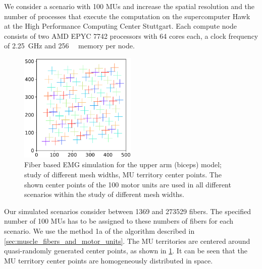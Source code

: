 We consider a scenario with 100 MUs and increase the spatial resolution and the number of processes that execute the computation on the supercomputer Hawk at the High Performance Computing Center Stuttgart. Each compute node consists of two AMD EPYC 7742 processors with 64 cores each, a clock frequency of \SI{2.25}{\giga\hertz} and \SI{256}{\giga\byte} memory per node.

\begin{figure}
  \centering%
  \includegraphics[width=0.5\textwidth]{images/results/application/MU_fibre_distribution_523x523_100mus_txt_mu_positions.pdf}%
  \caption{Fiber based EMG simulation for the upper arm (biceps) model; study of different mesh widths, MU territory center points. The shown center points of the 100 motor units are used in all different scenarios within the study of different mesh widths.}%
  \label{fig:MU_fibre_distribution_523x523_100mus_txt_mu_positions}%
\end{figure}

Our simulated scenarios consider between \num{1369} and \num{273529} fibers. The specified number of 100 MUs has to be assigned to these numbers of fibers for each scenario.
We use the method 1a of the algorithm described in \cref{sec:muscle_fibers_and_motor_units}. The MU territories are centered around quasi-randomly generated center points, as shown in \cref{fig:MU_fibre_distribution_523x523_100mus_txt_mu_positions}. It can be seen that the MU territory center points are homogeneously distributed in space.


